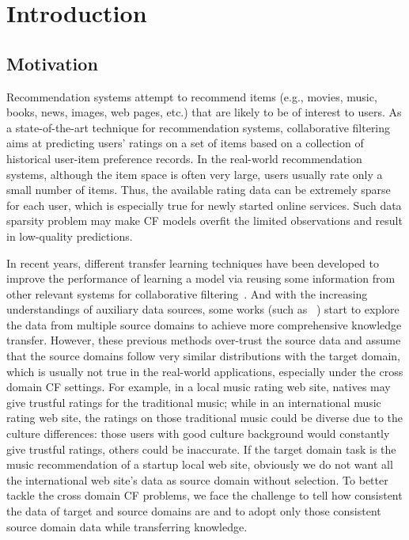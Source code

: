 \chapter{Introduction}
\label{chp:intro}

\hspace{0.1in}
\section{Motivation}
Recommendation systems attempt to recommend items (e.g., movies, music, books, news, images, web pages, etc.) that are likely to be of interest to users. As a state-of-the-art technique for recommendation systems, collaborative filtering aims at predicting users' ratings on a set of items based on a collection of historical user-item preference records.
In the real-world recommendation systems, although the item space is often very large, users usually rate only a small number of items. Thus, the available rating data can be extremely sparse for each user, which is especially true for newly started online services.
Such data sparsity problem may make CF models overfit the limited observations and result in low-quality predictions.


In recent years, different transfer learning techniques have been developed to improve the performance of learning a model via reusing some information from other relevant systems for collaborative filtering~\cite{/ijcai/libin09,/uai/ZhangCY10}.
And with the increasing understandings of auxiliary data sources, some works (such as ~\cite{DBLP:conf/aaai/EldardiryN11,DBLP:conf/sdm/ShiPGY12}) start to explore the data from multiple source domains to achieve more comprehensive knowledge transfer.
However, these previous methods over-trust the source data and assume that the source domains follow very similar distributions with the target domain, which is usually not true in the real-world applications, especially under the cross domain CF settings.
For example, in a local music rating web site, natives may give trustful ratings for the traditional music; while in an international music rating web site, the ratings on those traditional music could be diverse due to the culture differences: those users with good culture background would constantly give trustful ratings, others could be inaccurate. If the target domain task is the music recommendation of a startup local web site, obviously we do not want all the international web site's data as source domain without selection. To better tackle the cross domain CF problems, we face the challenge to tell how consistent the data of target and source domains are and to adopt only those consistent source domain data while transferring knowledge.

